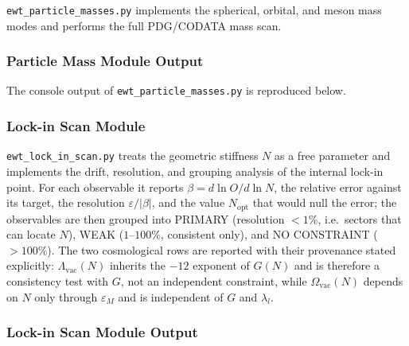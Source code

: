\documentclass[10pt,a4paper]{article}
\begin{document}
\texttt{ewt\_particle\_masses.py} implements the spherical, orbital, and meson mass modes and performs the full PDG/CODATA mass scan.



\subsubsection{Particle Mass Module Output}
\label{app:ewt_particle_masses_output}

The console output of \texttt{ewt\_particle\_masses.py} is reproduced below.



\subsubsection{Lock-in Scan Module}
\label{app:ewt_lock_in_scan}

\texttt{ewt\_lock\_in\_scan.py} treats the geometric stiffness $N$ as a free parameter and implements the drift, resolution, and grouping analysis of the internal lock-in point. For each observable it reports $\beta = d\ln O/d\ln N$, the relative error against its target, the resolution $\varepsilon/|\beta|$, and the value $N_{\text{opt}}$ that would null the error; the observables are then grouped into PRIMARY (resolution $<1\%$, i.e.\ sectors that can locate $N$), WEAK ($1$--$100\%$, consistent only), and NO CONSTRAINT ($>100\%$). The two cosmological rows are reported with their provenance stated explicitly: $\Lambda_{\text{vac}}(N)$ inherits the $-12$ exponent of $G(N)$ and is therefore a consistency test with $G$, not an independent constraint, while $\Omega_{\text{vac}}(N)$ depends on $N$ only through $\varepsilon_M$ and is independent of $G$ and $\lambda_l$.



\subsubsection{Lock-in Scan Module Output}
\label{app:ewt_lock_in_scan_output}
\end{document}
